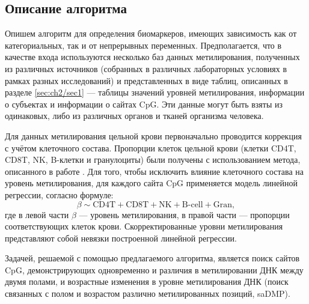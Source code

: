 \subsection{Описание алгоритма}\label{subsec:ch2/sec2/subsec1}

Опишем алгоритм для определения биомаркеров, имеющих зависимость как от категориальных, так и от непрерывных переменных. Предполагается, что в качестве входа используются несколько баз данных метилирования, полученных из различных источников (собранных в различных лабораторных условиях в рамках разных исследований) и представленных в виде таблиц, описанных в разделе \ref{sec:ch2/sec1} --- таблицы значений уровней метилирования, информации о субъектах и информации о сайтах CpG. Эти данные могут быть взяты из одинаковых, либо из различных органов и тканей организма человека. 

Для данных метилирования цельной крови первоначально проводится коррекция с учётом клеточного состава. Пропорции клеток цельной крови (клетки CD4T, CD8T, NK, B-клетки и гранулоциты) были получены с использованием метода, описанного в работе \autocite{Horvath2013}. Для того, чтобы исключить влияние клеточного состава на уровень метилирования, для каждого сайта CpG применяется модель линейной регрессии, согласно формуле:
\begin{equation}
\label{eq:cell_correction}
\beta \sim \text{CD4T} + \text{CD8T} + \text{NK} + \text{B-cell} + \text{Gran},
\end{equation}
где в левой части $\beta$ --- уровень метилирования, в правой части --- пропорции соответствующих клеток крови. Скорректированные уровни метилирования представляют собой невязки построенной линейной регрессии.

Задачей, решаемой с помощью предлагаемого алгоритма, является поиск сайтов CpG, демонстрирующих одновременно и различия в метилировании ДНК между двумя полами, и возрастные изменения в уровне метилирования ДНК (поиск связанных с полом и возрастом различно метилированных позиций, saDMP). 

